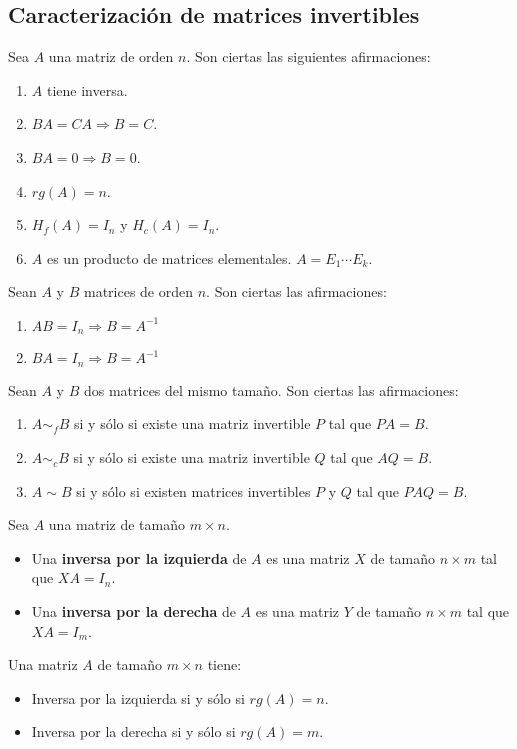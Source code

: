 \subsection{Caracterización de matrices invertibles}

Sea $A$ una matriz de orden $n$. Son ciertas las siguientes afirmaciones:
\begin{enumerate}
\item $A$ tiene inversa.
\item $BA = CA \Rightarrow B=C$.
\item $BA = 0 \Rightarrow B=0$.
\item $rg(A)=n$.
\item $H_f(A)=I_n$ y $H_c(A)=I_n$.
\item $A$ es un producto de matrices elementales. $A=E_1 \cdots E_k$.
\end{enumerate}

Sean $A$ y $B$ matrices de orden $n$. Son ciertas las afirmaciones:
\begin{enumerate}
\item $AB=I_n \Rightarrow B=A^{-1}$
\item $BA=I_n \Rightarrow B=A^{-1}$
\end{enumerate}

Sean $A$ y $B$ dos matrices del mismo tamaño. Son ciertas las afirmaciones:
\begin{enumerate}
\item $A \sim_f B$ si y sólo si existe una matriz invertible $P$ tal que $PA=B$.
\item $A \sim_c B$ si y sólo si existe una matriz invertible $Q$ tal que $AQ=B$.
\item $A \sim B$ si y sólo si existen matrices invertibles $P$ y $Q$ tal que $PAQ=B$.
\end{enumerate}

Sea $A$ una matriz de tamaño $m \times n$.
\begin{itemize}
\item Una \textbf{inversa por la izquierda} de $A$ es una matriz $X$ de tamaño $n \times m$ tal que $XA=I_n$.
\item Una \textbf{inversa por la derecha} de $A$ es una matriz $Y$ de tamaño $n \times m$ tal que $XA=I_m$.
\end{itemize}

Una matriz $A$ de tamaño $m \times n$ tiene:
\begin{itemize}
\item Inversa por la izquierda si y sólo si $rg(A) = n$.
\item Inversa por la derecha si y sólo si $rg(A) = m$.
\end{itemize}

